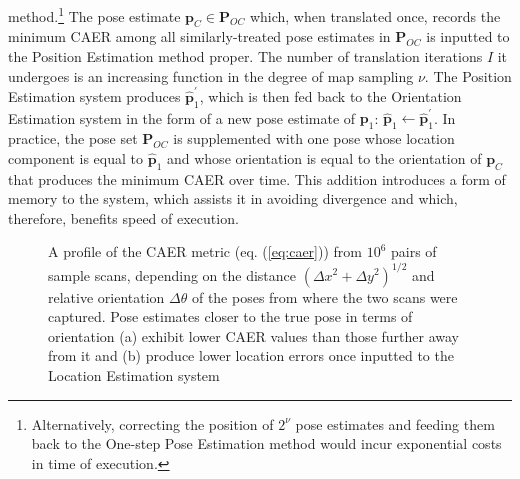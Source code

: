 method.\footnote{Alternatively, correcting the position of $2^\nu$ pose
estimates and feeding them back to the One-step Pose Estimation method would
incur exponential costs in time of execution.} The pose estimate $\bm{p}_C \in
\bm{P}_{OC}$ which, when translated once, records the minimum CAER among all
similarly-treated pose estimates in $\bm{P}_{OC}$ is inputted to the Position
Estimation method proper. The number of translation iterations $I$ it undergoes
is an increasing function in the degree of map sampling $\nu$.
The Position Estimation system produces $\hat{\bm{p}}_1^\prime$, which is then
fed back to the Orientation Estimation system in the form of a new pose
estimate of $\bm{p}_1$: $\hat{\bm{p}}_1 \leftarrow \hat{\bm{p}}_1^\prime$. In
practice, the pose set $\bm{P}_{OC}$ is supplemented with one pose whose
location component is equal to $\hat{\bm{p}}_1$ and whose orientation is equal
to the orientation of $\bm{p}_C$ that produces the minimum CAER over time. This
addition introduces a form of memory to the system, which assists it in
avoiding divergence and which, therefore, benefits speed of execution.

\begin{figure}[]\hspace{1cm}
  
  \vspace{1cm}
  \caption{\small A profile of the CAER metric (eq. (\ref{eq:caer})) from
           $10^6$ pairs of sample scans, depending on the distance
           $(\Delta x^2 + \Delta y^2)^{1/2}$ and relative orientation
           $\Delta \theta$ of the poses from where the two scans were captured.
           Pose estimates closer to the true pose in terms of orientation
           (a) exhibit lower CAER values than those further away from it and (b)
           produce lower location errors once inputted to the Location
           Estimation system}
  \label{fig:caer}
\end{figure}

